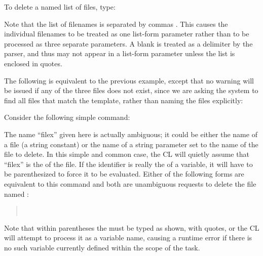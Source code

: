 \noindent
To delete a named list of files, type:

\begin{quotation}\noindent
{} 
\end{quotation}

\noindent
Note that the list of filenames is separated by commas 
.
This causes the individual filenames to be treated as one list-form 
parameter rather than to be processed as three separate parameters.
A blank is treated as a delimiter by the parser, and thus may not appear
in a list-form parameter unless the list is enclosed in quotes.

The following is equivalent to the previous example, except that no warning
will be issued if any of the three files does not exist, since we are asking
the system to find all files that match the template, rather than naming the
files explicitly:

\begin{quotation}\noindent
{} 
\end{quotation}

\noindent
Consider the following simple command:

\begin{quotation}\noindent
{} 
\end{quotation}

\noindent
The name ``filex'' given here is actually ambiguous; it could be either the
name of a file (a string constant) or the name of a string parameter
set to the name of the file to delete.  In this simple and common case,
the CL will quietly assume that ``filex'' is the  of the
file.  If the identifier  is really the 
of a variable, it will have to be parenthesized to force it to be evaluated.
Either of the following forms are equivalent to this command and both are
unambiguous requests to delete the file named :

\begin{quotation}\noindent
{} \\
\medskip
{} 
\end{quotation}

\noindent
Note that within parentheses the   
must be typed as shown, with quotes, or the CL will attempt to process
it as a variable name, causing a runtime error if there is no such variable
currently defined within the scope of the  task.

